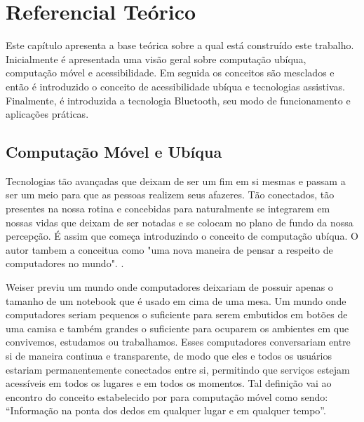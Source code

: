 \documentclass[english,brazilian]{UNISINOSmonografia}
\begin{document}
\chapter{Referencial Teórico}
Este capítulo apresenta a base teórica sobre a qual está construído este trabalho. Inicialmente é apresentada uma visão geral sobre computação ubíqua, computação móvel e acessibilidade. Em seguida os conceitos são mesclados e então é introduzido o conceito de acessibilidade ubíqua e tecnologias assistivas. Finalmente, é introduzida a tecnologia Bluetooth, seu modo de funcionamento e aplicações práticas.


	\section{Computação Móvel e Ubíqua}
Tecnologias tão avançadas que deixam de ser um fim em si mesmas e passam a ser um meio para que as pessoas realizem seus afazeres. Tão conectados, tão presentes na nossa rotina e concebidas para naturalmente se integrarem em nossas vidas que deixam de ser notadas e se colocam no plano de fundo da nossa percepção. É assim que  começa introduzindo o conceito de computação ubíqua. O autor tambem a conceitua como "uma nova maneira de pensar a respeito de computadores no mundo". \cite{Weiser1991}.

Weiser previu um mundo onde computadores deixariam de possuir apenas o tamanho de um notebook que é usado em cima de uma mesa. Um mundo onde computadores seriam pequenos o suficiente para serem embutidos em botões de uma camisa e também grandes o suficiente para ocuparem os ambientes em que convivemos, estudamos ou trabalhamos. Esses computadores conversariam entre si de maneira continua e transparente, de modo que eles e todos os usuários estariam permanentemente conectados entre si, permitindo que serviços estejam acessíveis em todos os lugares e em todos os momentos. Tal definição vai ao encontro do conceito estabelecido por  para computação móvel como sendo: “Informação na ponta dos dedos em qualquer lugar e em qualquer tempo”.
\end{document}
